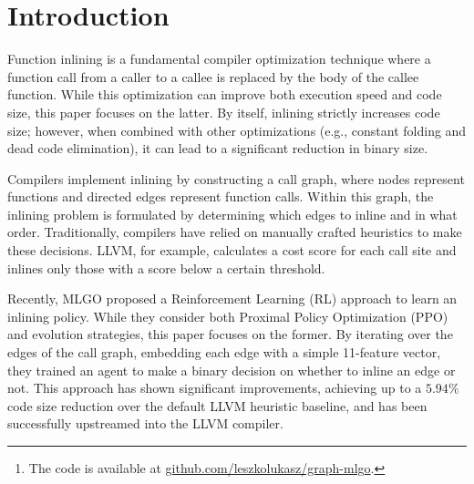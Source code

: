 \documentclass{article}
\newcommand\blfootnote[1]{%
  \begingroup
  \renewcommand\thefootnote{}\footnote{#1}%
  \addtocounter{footnote}{-1}%
  \endgroup
}
\theoremstyle{plain}
\theoremstyle{definition}
\theoremstyle{remark}
\begin{document}

\begin{abstract}
Inlining-for-size is a fundamental compiler optimization technique that aims to reduce code size by replacing function calls with the body of the called function. However, finding the optimal inlining strategy is NP-hard. While manual heuristics are traditionally used, modern approaches formulate the problem as a Markov Decision Process and apply Reinforcement Learning (RL) to learn an inlining policy.

Recent work has demonstrated that RL can outperform these heuristics, yet it relies on simple, low-dimensional representations of the call graph, which limits its potential. In this paper, we propose an extension to the RL formulation that incorporates a richer call graph representation using modern graph embedding techniques (Graph Neural Networks). \blfootnote{The code is available at \href{https://github.com/leszkolukasz/graph-mlgo}{github.com/leszkolukasz/graph-mlgo}.
}

\end{abstract}

\section{Introduction}

Function inlining is a fundamental compiler optimization technique where a function call from a caller to a callee is replaced by the body of the callee function. While this optimization can improve both execution speed and code size, this paper focuses on the latter. By itself, inlining strictly increases code size; however, when combined with other optimizations (e.g., constant folding and dead code elimination), it can lead to a significant reduction in binary size.

Compilers implement inlining by constructing a call graph, where nodes represent functions and directed edges represent function calls. Within this graph, the inlining problem is formulated by determining which edges to inline and in what order. Traditionally, compilers have relied on manually crafted heuristics to make these decisions. LLVM, for example, calculates a cost score for each call site and inlines only those with a score below a certain threshold.

Recently, MLGO \cite{MLGO} proposed a Reinforcement Learning (RL) approach to learn an inlining policy. While they consider both Proximal Policy Optimization (PPO) and evolution strategies, this paper focuses on the former. By iterating over the edges of the call graph, embedding each edge with a simple 11-feature vector, they trained an agent to make a binary decision on whether to inline an edge or not. This approach has shown significant improvements, achieving up to a $5.94\%$ code size reduction over the default LLVM heuristic baseline, and has been successfully upstreamed into the LLVM compiler.
\end{document}
